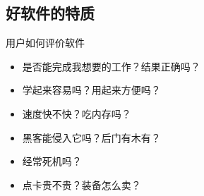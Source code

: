 \documentclass[CJK]{beamer}
\begin{document}
\subsection{好软件的特质}

\begin{frame}{用户如何评价软件}
  \begin{itemize}
    \item 是否能完成我想要的工作？结果正确吗？\structure{[正确性]}
    \pause
    \item 学起来容易吗？用起来方便吗？\structure{[易用性]}
    \pause
    \item 速度快不快？吃内存吗？\structure{[性能]}
    \pause
    \item 黑客能侵入它吗？后门有木有？\structure{[安全性]}
    \pause
    \item 经常死机吗？\structure{[稳定性]}
    \pause
    \item 点卡贵不贵？装备怎么卖？\structure{[成本]}
  \end{itemize}
\end{frame}
\end{document}
